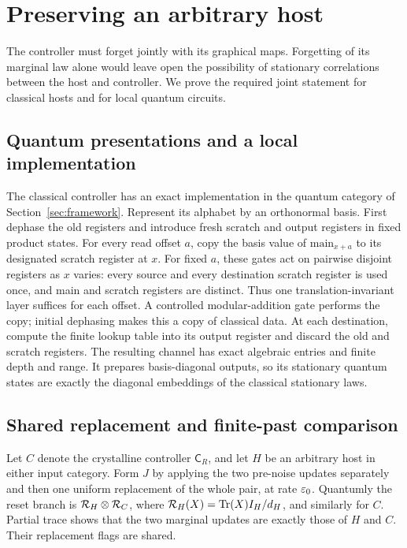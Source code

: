 \section{Preserving an arbitrary host}\label{sec:preservation}

The controller must forget jointly with its graphical maps.  Forgetting
of its marginal law alone would leave open the possibility of stationary
correlations between the host and controller.  We prove the required
joint statement for classical hosts and for local quantum circuits.

\subsection{Quantum presentations and a local implementation}
The classical controller has an exact implementation in the quantum category of Section~\ref{sec:framework}.
Represent its alphabet by an orthonormal basis.  First dephase the old
registers and introduce fresh scratch and output registers in fixed
product states.  For every read offset \(a\), copy the basis value of
\(\mathrm{main}_{x+a}\) to its designated scratch register at \(x\).
For fixed \(a\), these gates act on pairwise disjoint registers as \(x\)
varies: every source and every destination scratch register is used
once, and main and scratch registers are distinct.  Thus one
translation-invariant layer suffices for each offset.  A controlled
modular-addition gate performs the copy; initial dephasing makes this
a copy of classical data.  At each destination, compute the finite
lookup table into its output register and discard the old and scratch
registers.  The resulting channel has exact algebraic entries and
finite depth and range.  It prepares basis-diagonal outputs, so its
stationary quantum states are exactly the diagonal embeddings of the
classical stationary laws.

\subsection{Shared replacement and finite-past comparison}
Let \(C\) denote the crystalline controller \(\mathsf C_R\), and let \(H\) be
an arbitrary host in either input category.  Form \(J\) by applying
the two pre-noise updates separately and then one uniform replacement
of the whole pair, at rate \(\varepsilon_0\).  Quantumly the reset branch is
\(\mathcal R_H\otimes\mathcal R_C\), where
\(\mathcal R_H(X)=\operatorname{Tr}(X)I_H/d_H\), and similarly for \(C\).  Partial trace
shows that the two marginal updates are exactly those of \(H\) and
\(C\).  Their replacement flags are shared.


